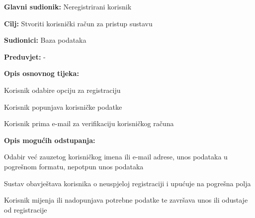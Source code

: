 					\noindent {}
					\begin{packed_item}
	
						\item \textbf{Glavni sudionik: }Neregistrirani korisnik
						\item  \textbf{Cilj:} Stvoriti korisnički račun za pristup sustavu
						\item  \textbf{Sudionici:} Baza podataka
						\item  \textbf{Preduvjet:} -
						\item  \textbf{Opis osnovnog tijeka:}
						
						\item[] \begin{packed_enum}
	
							\item Korisnik odabire opciju za registraciju
							\item Korisnik popunjava korisničke podatke
							\item Korisnik prima e-mail za verifikaciju korisničkog računa
						\end{packed_enum}
						
						\item  \textbf{Opis mogućih odstupanja:}
						
						\item[] \begin{packed_item}
	
							\item[2.a] Odabir već zauzetog korisničkog imena ili e-mail adrese, unos podataka
							u pogrešnom formatu, nepotpun unos podataka
							\item[] \begin{packed_enum}
								
								\item Sustav obavještava korisnika o neuspjeloj registraciji i upućuje na pogrešna polja
								\item Korisnik mijenja ili nadopunjava potrebne podatke te završava unos ili odustaje od registracije
								
							\end{packed_enum}
							
						\end{packed_item}
					\end{packed_item}
					
